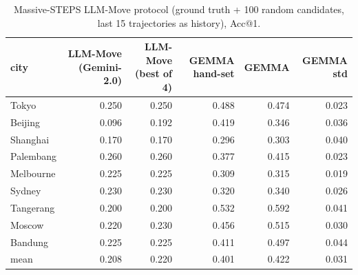 \begin{table}[t]
\centering\small
\caption{Massive-STEPS LLM-Move protocol (ground truth + 100 random candidates, last 15 trajectories as history), Acc@1.}
\label{tab:A7_llm_protocol}
\begin{tabular}{lrrrrr}
\toprule
city & LLM-Move (Gemini-2.0) & LLM-Move (best of 4) & GEMMA hand-set & GEMMA & GEMMA std \\
\midrule
Tokyo & 0.250 & 0.250 & 0.488 & 0.474 & 0.023 \\
Beijing & 0.096 & 0.192 & 0.419 & 0.346 & 0.036 \\
Shanghai & 0.170 & 0.170 & 0.296 & 0.303 & 0.040 \\
Palembang & 0.260 & 0.260 & 0.377 & 0.415 & 0.023 \\
Melbourne & 0.225 & 0.225 & 0.309 & 0.315 & 0.019 \\
Sydney & 0.230 & 0.230 & 0.320 & 0.340 & 0.026 \\
Tangerang & 0.200 & 0.200 & 0.532 & 0.592 & 0.041 \\
Moscow & 0.220 & 0.230 & 0.456 & 0.515 & 0.030 \\
Bandung & 0.225 & 0.225 & 0.411 & 0.497 & 0.044 \\
mean & 0.208 & 0.220 & 0.401 & 0.422 & 0.031 \\
\bottomrule
\end{tabular}
\end{table}
